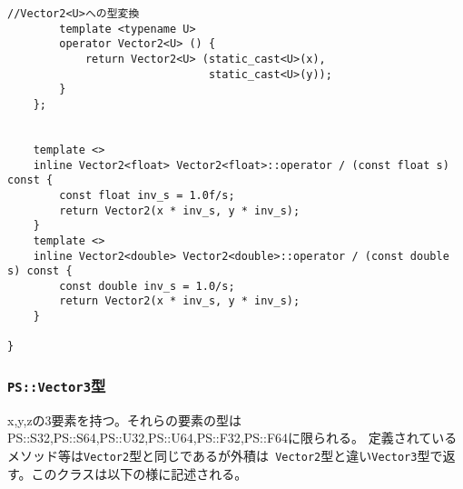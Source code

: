 \begin{lstlisting}[caption=Vector2]
        //Vector2<U>への型変換
        template <typename U>
        operator Vector2<U> () {
            return Vector2<U> (static_cast<U>(x),
                               static_cast<U>(y));
        }
    };


    template <>
    inline Vector2<float> Vector2<float>::operator / (const float s) const {
        const float inv_s = 1.0f/s;
        return Vector2(x * inv_s, y * inv_s);
    }
    template <>
    inline Vector2<double> Vector2<double>::operator / (const double s) const {
        const double inv_s = 1.0/s;
        return Vector2(x * inv_s, y * inv_s);
    }

}
\end{lstlisting}

\subsubsection{{\tt PS::Vector3}型}

x,y,zの3要素を持つ。それらの要素の型は
{PS::S32},{PS::S64},{PS::U32},{PS::U64},{PS::F32},{PS::F64}に限られる。
定義されているメソッド等は{\tt Vector2}型と同じであるが外積は{\tt
Vector2}型と違い{\tt Vector3}型で返す。このクラスは以下の様に記述される。

